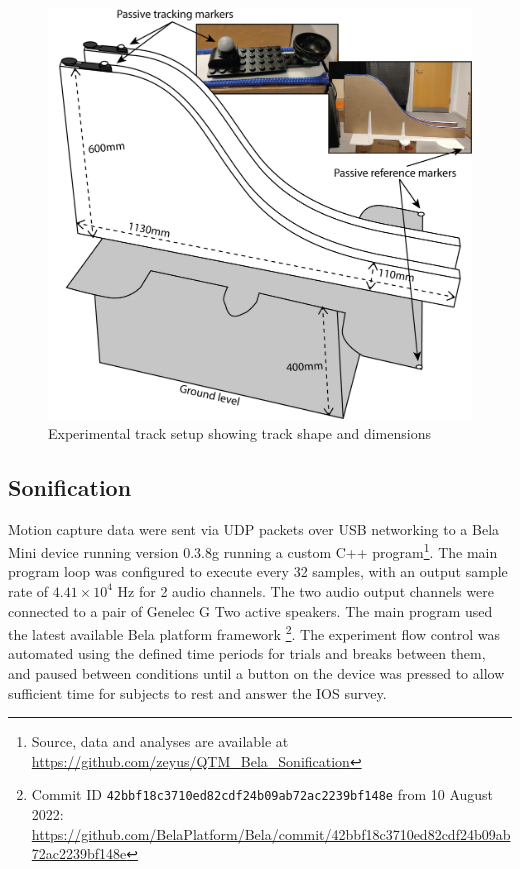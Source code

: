 \documentclass[10pt,a4paper,onecolumn]{article}
\begin{document}
\begin{figure}

{\centering \includegraphics[width=1\linewidth]{figures/track_dimensions} 

}

\caption{Experimental track setup showing track shape and dimensions}\label{fig:track-setup}
\end{figure}

\hypertarget{sonification-1}{%
\subsection{Sonification}\label{sonification-1}}

Motion capture data were sent via UDP packets over USB networking to a Bela Mini device running version 0.3.8g running a custom C++ program\footnote{Source, data and analyses are available at \url{https://github.com/zeyus/QTM_Bela_Sonification}}. The main program loop was configured to execute every 32 samples, with an output sample rate of \ensuremath{4.41\times 10^{4}} Hz for 2 audio channels. The two audio output channels were connected to a pair of Genelec G Two active speakers. The main program used the latest available Bela platform framework \footnote{Commit ID \texttt{42bbf18c3710ed82cdf24b09ab72ac2239bf148e} from 10 August 2022: \url{https://github.com/BelaPlatform/Bela/commit/42bbf18c3710ed82cdf24b09ab72ac2239bf148e}}. The experiment flow control was automated using the defined time periods for trials and breaks between them, and paused between conditions until a button on the device was pressed to allow sufficient time for subjects to rest and answer the IOS survey.
\end{document}
